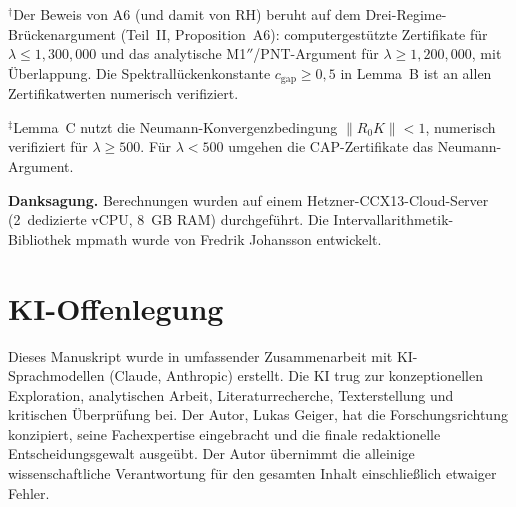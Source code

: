 \documentclass[12pt,a4paper]{article}
\theoremstyle{definition}
\theoremstyle{remark}
\begin{document}
\noindent${}^\dagger$Der Beweis von A6 (und damit von RH) beruht auf dem Drei-Regime-Brückenargument (Teil~II, Proposition~A6): computergestützte Zertifikate für $\lambda \leq 1{,}300{,}000$ und das analytische M1$''$/PNT-Argument für $\lambda \geq 1{,}200{,}000$, mit Überlappung. Die Spektrallückenkonstante $c_{\mathrm{gap}} \geq 0{,}5$ in Lemma~B ist an allen Zertifikatwerten numerisch verifiziert.

\noindent${}^\ddagger$Lemma~C nutzt die Neumann-Konvergenzbedingung $\|R_0 K\| < 1$, numerisch verifiziert für $\lambda \geq 500$. Für $\lambda < 500$ umgehen die CAP-Zertifikate das Neumann-Argument.

\bigskip
\noindent\textbf{Danksagung.} Berechnungen wurden auf einem Hetzner-CCX13-Cloud-Server (2~dedizierte vCPU, 8~GB RAM) durchgeführt. Die Intervallarithmetik-Bibliothek mpmath wurde von Fredrik Johansson entwickelt.


\section*{KI-Offenlegung}

Dieses Manuskript wurde in umfassender Zusammenarbeit mit KI-Sprachmodellen (Claude, Anthropic) erstellt. Die KI trug zur konzeptionellen Exploration, analytischen Arbeit, Literaturrecherche, Texterstellung und kritischen Überprüfung bei. Der Autor, Lukas Geiger, hat die Forschungsrichtung konzipiert, seine Fachexpertise eingebracht und die finale redaktionelle Entscheidungsgewalt ausgeübt. Der Autor übernimmt die alleinige wissenschaftliche Verantwortung für den gesamten Inhalt einschließlich etwaiger Fehler.
\end{document}
